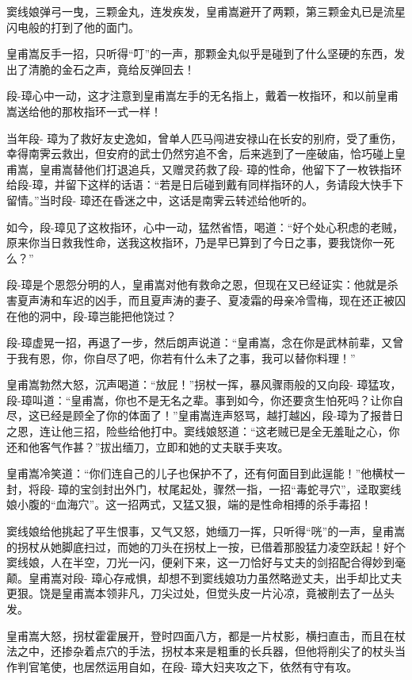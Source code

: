 \documentclass[12pt,oneside]{book}
\begin{document}
窦线娘弹弓一曳，三颗金丸，连发疾发，皇甫嵩避开了两颗，第三颗金丸已是流星闪电般的打到了他的面门。

皇甫嵩反手一招，只听得``叮''的一声，那颗金丸似乎是碰到了什么坚硬的东西，发出了清脆的金石之声，竟给反弹回去！

段-璋心中一动，这才注意到皇甫嵩左手的无名指上，戴着一枚指环，和以前皇甫嵩送给他的那枚指环一式一样！

当年段-
璋为了救好友史逸如，曾单人匹马闯进安禄山在长安的别府，受了重伤，幸得南霁云救出，但安府的武士仍然穷追不舍，后来逃到了一座破庙，恰巧碰上皇甫嵩，皇甫嵩替他们打退追兵，又赠灵药救了段-
璋的性命，他留下了一枚铁指环给段-璋，并留下这样的话语：``若是日后碰到戴有同样指环的人，务请段大快手下留情。''当时段-
璋还在昏迷之中，这话是南霁云转述给他听的。

如今，段-璋见了这枚指环，心中一动，猛然省悟，喝道：``好个处心积虑的老贼，原来你当日救我性命，送我这枚指环，乃是早已算到了今日之事，要我饶你一死么？''

段-璋是个恩怨分明的人，皇甫嵩对他有救命之恩，但现在又已经证实：他就是杀害夏声涛和车迟的凶手，而且夏声涛的妻子、夏凌霜的母亲冷雪梅，现在还正被囚在他的洞中，段-璋岂能把他饶过？

段-璋虚晃一招，再退了一步，然后朗声说道：``皇甫嵩，念在你是武林前辈，又曾于我有恩，你，你自尽了吧，你若有什么未了之事，我可以替你料理！''

皇甫嵩勃然大怒，沉声喝道：``放屁！''拐杖一挥，暴风骤雨般的又向段-
璋猛攻，段-璋叫道：``皇甫嵩，你也不是无名之辈。事到如今，你还要贪生怕死吗？让你自尽，这已经是顾全了你的体面了！''皇甫嵩连声怒骂，越打越凶，段-璋为了报昔日之恩，连让他三招，险些给他打中。窦线娘怒道：``这老贼已是全无羞耻之心，你还和他客气作甚？''拔出缅刀，立即和她的丈夫联手夹攻。

皇甫嵩冷笑道：``你们连自己的儿子也保护不了，还有何面目到此逞能！''他横杖一封，将段-
璋的宝剑封出外门，杖尾起处，骤然一指，一招``毒蛇寻穴''，迳取窦线娘小腹的``血海穴''。这一招两式，又猛又狠，端的是性命相搏的杀手毒招！

窦线娘给他挑起了平生恨事，又气又怒，她缅刀一挥，只听得``咣''的一声，皇甫嵩的拐杖从她脚底扫过，而她的刀头在拐杖上一按，已借着那股猛力凌空跃起！好个窦线娘，人在半空，刀光一闪，便剁下来，这一刀恰好与丈夫的剑招配合得妙到毫颠。皇甫嵩对段-
璋心存戒惧，却想不到窦线娘功力虽然略逊丈夫，出手却比丈夫更狠。饶是皇甫嵩本领非凡，刀尖过处，但觉头皮一片沁凉，竟被削去了一丛头发。

皇甫嵩大怒，拐杖霍霍展开，登时四面八方，都是一片杖影，横扫直击，而且在杖法之中，还掺杂着点穴的手法，拐杖本来是粗重的长兵器，但他将削尖了的杖头当作判官笔使，也居然运用自如，在段-
璋大妇夹攻之下，依然有守有攻。
\end{document}

